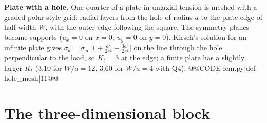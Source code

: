 {{{{{\textbf{Plate with a hole.} One quarter of a plate in uniaxial tension is meshed with a graded polar-style grid: radial layers from the hole of radius $a$ to the plate edge of half-width $W$, with the outer edge following the square. The symmetry planes become supports ($u_x=0$ on $x=0$, $u_y=0$ on $y=0$). Kirsch's solution for an infinite plate gives $\sigma_\theta=\sigma_\infty\big[1+\frac{a^2}{2r^2}+\frac{3a^4}{2r^4}\big]$ on the line through the hole perpendicular to the load, so $K_t=3$ at the edge; a finite plate has a slightly larger $K_t$ ($3.10$ for $W/a=12$, $3.60$ for $W/a=4$ with Q4).
@@CODE fem.py|def hole_mesh|11@@

\section{The three-dimensional block}
\label{sec:block}

}}}}}
